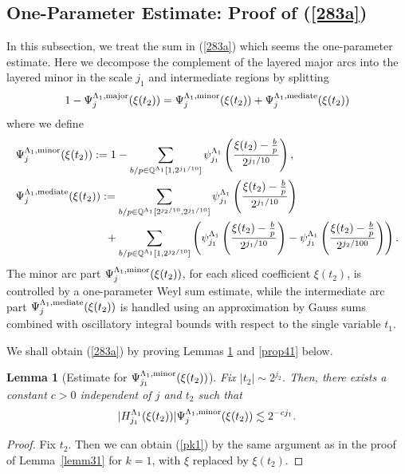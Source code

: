 \documentclass[11 pt,letterpaper]{amsart}
\theoremstyle{plain}
\newtheorem{lemma}{Lemma}\numberwithin{lemma}{section}
\theoremstyle{definition}
\theoremstyle{remark} \theoremstyle{exam} \theoremstyle{ob}
\numberwithin{equation}{section}
\begin{document}
\subsection{One-Parameter Estimate: Proof of (\ref{283a})}\label{Sec42v} In this subsection, we treat the sum in   (\ref{283a}) which seems the one-parameter estimate.
Here we decompose the complement of the layered major arcs into the layered minor in the scale $j_1$ and intermediate regions by splitting
$$  1-\Psi^{\Lambda_1,\rm{major}}_{j}(\xi(t_2))= \Psi^{\Lambda_1,\rm{minor}}_{j}(\xi(t_2)) +
\Psi^{\Lambda_1,\rm{mediate}}_{j}(\xi(t_2))  $$ 
where we define
\begin{align*} 
&\Psi^{\Lambda_1,\rm{minor}}_{j}(\xi(t_2)) :=1 -\sum_{b/p\in  \mathbb{Q}^{\Lambda_1}[1,2^{j_1/10}]}\psi^{\Lambda_1}_{j_1}\left(\frac{\xi(t_2)-\frac{b}{p}}{2^{j_1/10}}\right), \nonumber \\
&\Psi^{\Lambda_1,\rm{mediate}}_{j}(\xi(t_2)):=\sum_{b/p\in  \mathbb{Q}^{\Lambda_1}[2^{j_2/10},2^{j_1/10}]}\psi^{\Lambda_1}_{j_1}\left(\frac{\xi(t_2)-\frac{b}{p}}{2^{j_1/10}}\right) \nonumber \\
&\qquad\quad\qquad\qquad\quad+
\sum_{b/p\in  \mathbb{Q}^{\Lambda_1}[1,2^{j_2/10}]}
 \left( \psi^{\Lambda_1}_{j_1}\left(\frac{\xi(t_2)-\frac{b}{p}}{2^{j_1/10}}\right)-\psi^{\Lambda_1}_{j_1}\left(\frac{\xi(t_2)-\frac{b}{p}}{2^{j_2/100}}\right) \right).
    \end{align*}
The minor arc part $\Psi^{\Lambda_1,\rm{minor}}_{j}(\xi(t_2))$, for each sliced coefficient $\xi(t_2)$, is controlled by a one-parameter Weyl sum estimate, while the intermediate arc part $\Psi^{\Lambda_1,\rm{mediate}}_{j}(\xi(t_2))$ is handled using an approximation by Gauss sums combined with oscillatory integral bounds with respect to the single variable $t_1$.
 
 
  
   
We shall obtain (\ref{283a}) by proving Lemmas \ref{prop130} and \ref{prop41} below.
\begin{lemma}[Estimate for $\Psi^{\Lambda_1,\rm{minor}}_{j_1}(\xi(t_2))$]\label{prop130}
Fix $|t_2|\sim 2^{j_2}$.
Then, there exists a constant   $c>0$  independent of $j$ and $t_2$ such that
\begin{align}\label{pk1}
|H^{\Lambda_1}_{j_1}( \xi(t_2)) | \Psi^{\Lambda_1,\rm{minor}}_{j}(\xi(t_2))  \lesssim 2^{-c j_1}. 
\end{align}
\end{lemma}
\begin{proof}
Fix $t_2$. Then we can obtain (\ref{pk1}) by the same argument as in the proof of Lemma~\ref{lemm31} for $k=1$, with $\xi$ replaced by $\xi(t_2)$. \end{proof}
\end{document}
